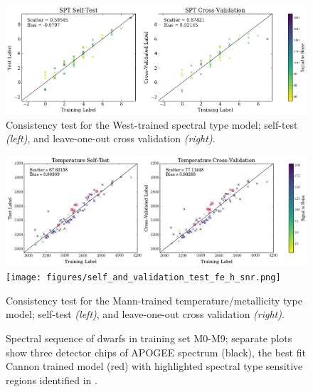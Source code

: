 \documentclass[modern]{aastex62}
\begin{document}

\newpage

\begin{figure}[ht]
\begin{center}
\includegraphics[width=18cm]{figures/self_and_validation_test_spt_snr.png}
\end{center}
\caption{Consistency test for the West-trained spectral type model; self-test \textit{(left)}, and leave-one-out cross validation \textit{(right)}.} \label{fig:west_validation}
\end{figure}

\begin{figure}[ht]
\begin{center}
\includegraphics[width=18cm]{figures/self_and_validation_test_teff_snr.png}
\texttt{[image: figures/self\_and\_validation\_test\_fe\_h\_snr.png]}
\end{center}
\caption{Consistency test for the Mann-trained temperature/metallicity type model; self-test \textit{(left)}, and leave-one-out cross validation \textit{(right)}.} \label{fig:mann_validation}
\end{figure}

\begin{figure}[ht]
\caption{ Spectral sequence of dwarfs in training set M0-M9; separate plots show three detector chips of APOGEE spectrum (black), the best fit Cannon trained model (red) with highlighted spectral type sensitive regions identified in \citealt{Desphande:2013}.} \label{fig:sp_sequence}
\end{figure}
\end{document}
